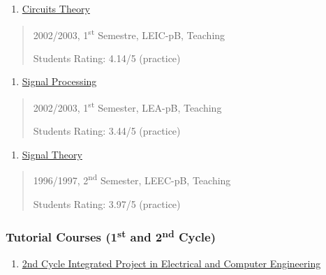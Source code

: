 \begin{enumerate}
\def\labelenumi{\arabic{enumi}.}
\setcounter{enumi}{18}
\item
  \ul{Circuits Theory}
\end{enumerate}

\begin{quote}

2002/2003, 1\textsuperscript{st} Semestre, LEIC-pB, Teaching

Students Rating: 4.14/5 (practice)

\end{quote}

\begin{enumerate}
\def\labelenumi{\arabic{enumi}.}
\setcounter{enumi}{19}
\item
  \ul{Signal Processing}
\end{enumerate}

\begin{quote}
2002/2003, 1\textsuperscript{st} Semester, LEA-pB, Teaching

Students Rating: 3.44/5 (practice)
\end{quote}

\begin{enumerate}
\def\labelenumi{\arabic{enumi}.}
\setcounter{enumi}{20}
\item
  \ul{Signal Theory}
\end{enumerate}

\begin{quote}
1996/1997, 2\textsuperscript{nd} Semester, LEEC-pB, Teaching

Students Rating: 3.97/5 (practice)
\end{quote}

\subsubsection{\texorpdfstring{Tutorial Courses (1\textsuperscript{st}
and 2\textsuperscript{nd}
Cycle)}{Tutorial Courses (1st and 2nd Cycle)}}\label{tutorial-courses-1st-and-2nd-cycle}

\begin{enumerate}
\def\labelenumi{\arabic{enumi}.}
\setcounter{enumi}{21}
\item
  \ul{2nd Cycle Integrated Project in Electrical and Computer
  Engineering}
\end{enumerate}

